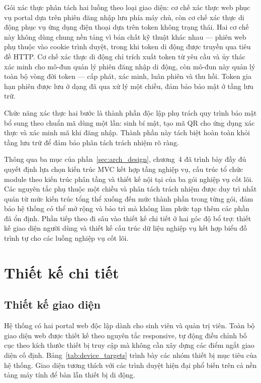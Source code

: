 \documentclass[../DoAn.tex]{subfiles}
\begin{document}
Gói xác thực phân tách hai luồng theo loại giao diện: cơ chế xác thực web phục
vụ portal dựa trên phiên đăng nhập lưu phía máy chủ, còn cơ chế xác thực di
động phục vụ ứng dụng điện thoại dựa trên token không trạng thái. Hai cơ chế
này không dùng chung nền tảng vì bản chất kỹ thuật khác nhau --- phiên web phụ
thuộc vào cookie trình duyệt, trong khi token di động được truyền qua tiêu đề
HTTP. Cơ chế xác thực di động chỉ trích xuất token từ yêu cầu và ủy thác xác
minh cho mô-đun quản lý phiên đăng nhập di động, còn mô-đun này quản lý toàn
bộ vòng đời token --- cấp phát, xác minh, luân phiên và thu hồi. Token gia hạn
phiên được lưu ở dạng đã qua xử lý một chiều, đảm bảo bảo mật ở tầng lưu trữ.

Chức năng xác thực hai bước là thành phần độc lập phụ trách quy trình bảo mật
bổ sung theo chuẩn mã dùng một lần: sinh bí mật, tạo mã QR cho ứng dụng xác
thực và xác minh mã khi đăng nhập. Thành phần này tách biệt hoàn toàn khỏi
tầng lưu trữ để đảm bảo phân tách trách nhiệm rõ ràng.

Thông qua ba mục của phần~\ref{sec:arch_design}, chương~4 đã trình bày đầy đủ
quyết định lựa chọn kiến trúc MVC kết hợp tầng nghiệp vụ, cấu trúc tổ chức
module theo kiến trúc phân tầng và thiết kế nội tại của ba gói nghiệp vụ cốt
lõi. Các nguyên tắc phụ thuộc một chiều và phân tách trách nhiệm được duy trì
nhất quán từ mức kiến trúc tổng thể xuống đến mức thành phần trong từng gói,
đảm bảo hệ thống có thể mở rộng và bảo trì mà không làm phức tạp thêm các phần
đã ổn định. Phần tiếp theo đi sâu vào thiết kế chi tiết ở hai góc độ bổ trợ:
thiết kế giao diện người dùng và thiết kế cấu trúc dữ liệu nghiệp vụ kết hợp
biểu đồ trình tự cho các luồng nghiệp vụ cốt lõi.

\section{Thiết kế chi tiết}
\label{sec:detail_design}

\subsection{Thiết kế giao diện}
\label{subsec:ui_design}

Hệ thống có hai portal web độc lập dành cho sinh viên và quản trị viên. Toàn
bộ giao diện web được thiết kế theo nguyên tắc responsive, tự động điều chỉnh
bố cục theo kích thước thiết bị truy cập mà không cần xây dựng các điểm ngắt
giao diện cố định. Bảng~\ref{tab:device_targets} trình bày các nhóm thiết bị
mục tiêu của hệ thống. Giao diện tương thích với các trình duyệt hiện đại
phổ biến trên cả nền tảng máy tính để bàn lẫn thiết bị di động.
\end{document}
